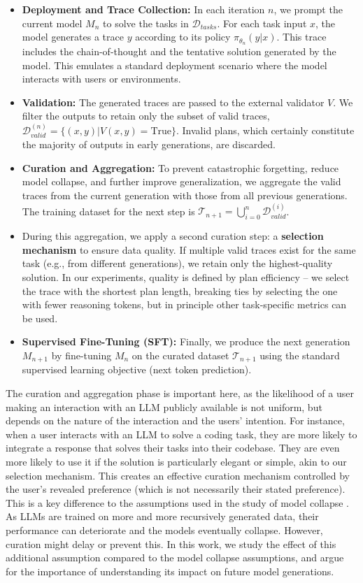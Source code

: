 \begin{itemize}
    \item \textbf{Deployment and Trace Collection:} In each iteration $n$, we prompt the current model $M_n$ to solve the tasks in $\mathcal{D}_{tasks}$. For each task input $x$, the model generates a trace $y$ according to its policy $\pi_{\theta_n}(y|x)$. This trace includes the chain-of-thought and the tentative solution generated by the model. This emulates a standard deployment scenario where the model interacts with users or environments.
    \item \textbf{Validation:} The generated traces are passed to the external validator $V$. We filter the outputs to retain only the subset of valid traces, $\mathcal{D}_{valid}^{(n)} = \{(x, y) |V(x, y) = \text{True}\}$. Invalid plans, which certainly constitute the majority of outputs in early generations, are discarded.
    \item \textbf{Curation and Aggregation:} To prevent catastrophic forgetting, reduce model collapse, and further improve generalization, we aggregate the valid traces from the current generation with those from all previous generations. The training dataset for the next step is $\mathcal{T}_{n+1} = \bigcup_{i=0}^{n} \mathcal{D}_{valid}^{(i)}$.
    \item During this aggregation, we apply a second curation step: a \textbf{selection mechanism} to ensure data quality. If multiple valid traces exist for the same task (e.g., from different generations), we retain only the highest-quality solution. In our experiments, quality is defined by plan efficiency -- we select the trace with the shortest plan length, breaking ties by selecting the one with fewer reasoning tokens, but in principle other task-specific metrics can be used.
    \item \textbf{Supervised Fine-Tuning (SFT):} Finally, we produce the next generation $M_{n+1}$ by fine-tuning $M_n$ on the curated dataset $\mathcal{T}_{n+1}$ using the standard supervised learning objective (next token prediction).
\end{itemize}

The curation and aggregation phase is important here, as the likelihood of a
user making an interaction with an LLM publicly available is not uniform, but
depends on the nature of the interaction and the users' intention. For instance,
when a user interacts with an LLM to solve a coding task, they are more likely
to integrate a response that solves their tasks into their codebase. They are
even more likely to use it if the solution is particularly elegant or simple,
akin to our selection mechanism. This creates an effective curation mechanism
controlled by the user's revealed preference (which is not necessarily their
stated preference). This is a key difference to the assumptions used in the study of model collapse \cite{shumailov-et-al-nature2024}.
As LLMs are trained on more and more recursively generated data, their
performance can deteriorate and the models eventually collapse. However, curation might delay or prevent
this.
In this work, we study the effect of this additional assumption compared to the model collapse assumptions, and
argue for the importance of understanding its impact on future model
generations.

